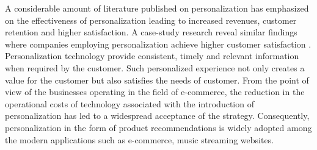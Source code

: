 A considerable amount of literature published on personalization has emphasized on the  effectiveness of personalization leading to increased revenues, customer retention and higher satisfaction. A case-study research reveal similar findings where companies employing personalization achieve higher customer satisfaction \autocite[33]{Jackson2007}. Personalization technology provide consistent, timely and relevant information when required by the customer. Such personalized experience not only creates a value for the customer but also satisfies the needs of customer. From the point of view of the businesses operating in the field of e-commerce, the reduction in the operational costs of technology associated with the introduction of personalization has led to a widespread acceptance of the strategy. Consequently, personalization in the form of product recommendations is widely adopted among the modern applications such as e-commerce, music streaming websites. \\ 
\par


